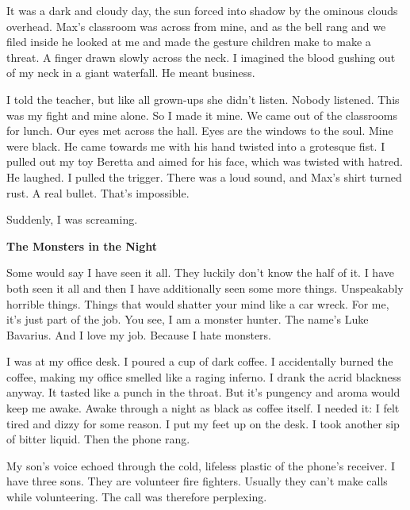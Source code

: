 It was a dark and cloudy day, the sun forced into shadow by the
ominous clouds overhead. Max's classroom was across from
mine, and as the bell rang and we filed inside he looked at me and
made the gesture children make to make a threat. A finger drawn
slowly across the neck. I imagined the blood gushing out of my neck
in a giant waterfall. He meant business.



I told the teacher, but like all grown-ups she didn't listen.
Nobody listened. This was my fight and mine alone. So I made it
mine. We came out of the classrooms for lunch. Our eyes met across
the hall. Eyes are the windows to the soul. Mine were black. He
came towards me with his hand twisted into a grotesque fist. I
pulled out my toy Beretta and aimed for his face, which was twisted
with hatred. He laughed. I pulled the trigger. There was a loud
sound, and Max's shirt turned rust. A real bullet.
That's impossible.



Suddenly, I was screaming. 
 





{\bf The Monsters in the Night}



Some would say I have seen it all. They luckily don't know
the half of it. I have both seen it all and then I have
additionally seen some more things. Unspeakably horrible things.
Things that would shatter your mind like a car wreck. For me,
it's just part of the job. You see, I am a monster hunter.
The name's Luke Bavarius. And I love my job. Because I hate
monsters.



I was at my office desk. I poured a cup of dark coffee. I
accidentally burned the coffee, making my office smelled like a
raging inferno. I drank the acrid blackness anyway. It tasted like
a punch in the throat. But it's pungency and aroma would keep
me awake. Awake through a night as black as coffee itself. I needed
it: I felt tired and dizzy for some reason. I put my feet up on the
desk. I took another sip of bitter liquid. Then the phone
rang.



My son's voice echoed through the cold, lifeless plastic of
the phone's receiver. I have three sons. They are volunteer
fire fighters. Usually they can't make calls while
volunteering. The call was therefore perplexing.



